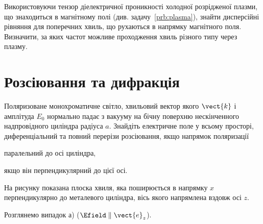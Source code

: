 \begin{problem}
Використовуючи тензор діелектричної проникності холодної розрідженої плазми, що знаходиться в магнітному полі (див. задачу~\ref{prb:plasma}), знайти дисперсійні рівняння для поперечних хвиль, що рухаються в напрямку магнітного поля. Визначити, за яких частот можливе проходження хвиль різного типу через плазму.
\end{problem}

\section{Розсіювання та дифракція}

\begin{problem}\label{prb:Zang_metall_Cyllinder}%
Поляризоване монохроматичне світло, хвильовий вектор якого $\vect{k}$  і амплітуда $E_0$ нормально падає з вакууму на бічну поверхню нескінченного надпровідного циліндра радіуса $a$. Знайдіть електричне поле у всьому просторі, диференціальний та повний перерізи розсіювання, якщо напрямок поляризації 
\begin{enumerate*}[label=\alph*)]
\item паралельний до осі циліндра,
\item якщо він перпендикулярний до цієї осі.
\end{enumerate*}
\begin{solution}
	На рисунку показана плоска хвиля, яка поширюється в напрямку $x$ перпендикулярно до металевого циліндра, вісь якого напрямлена вздовж осі $z$. 

	\begin{center}
	\end{center}

    Розглянемо випадок а) ($\Efield \parallel \vect{e}_z$). 


\end{solution}
\end{problem}
